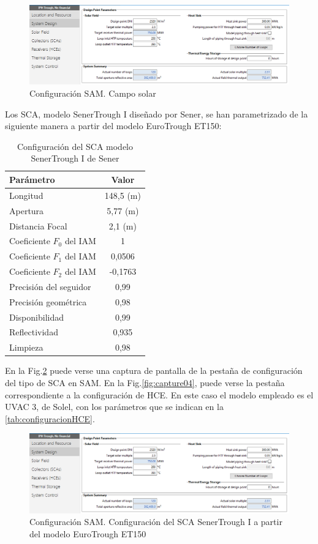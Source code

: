 \begin{figure}[!h]
\includegraphics[width=0.9\linewidth]{images/captura_sam_iph02.png}
\caption{Configuración SAM. Campo solar} 
\label{fig:captura02}
\end{figure}

Los SCA, modelo SenerTrough I diseñado por Sener, se han parametrizado de la siguiente manera a partir del modelo EuroTrough ET150:

\begin{table}[!h]
\centering
\caption{Configuración del SCA modelo SenerTrough I de Sener}
\label{tab:configuracionSCA}
\begin{tabular}{lc}
Parámetro & Valor \\ \hline
Longitud &  148,5  (m) \\
Apertura &  5,77  (m) \\
Distancia Focal & 2,1 (m) \\
Coeficiente $F_{0}$ del  IAM  &  1 \\
Coeficiente $F_{1}$ del  IAM  &  0,0506 \\
Coeficiente $F_{2}$ del  IAM  &  -0,1763 \\
Precisión del seguidor &  0,99 \\
Precisión geométrica &  0,98 \\
Disponibilidad &  0,99 \\
Reflectividad &  0,935 \\
Limpieza &  0,98
\end{tabular}
\end{table}


En la Fig.\ref{fig:captura03} puede verse una captura de pantalla de la pestaña de configuración del tipo de SCA en SAM. En la Fig.\ref{fig:capture04}, puede verse la pestaña correspondiente a la configuración de HCE. En este caso el modelo empleado es el UVAC 3, de Solel, con los parámetros que se indican en la \ref{tab:configuracionHCE}.


\begin{figure}[!h]
\includegraphics[width=0.9\linewidth]{images/captura_sam_iph02.png}
\caption{Configuración SAM. Configuración del SCA SenerTrough I a partir del modelo EuroTrough ET150} 
\label{fig:captura03}
\end{figure}

